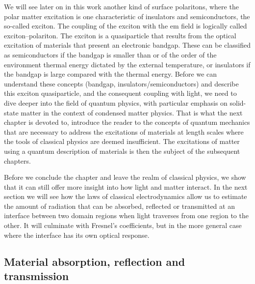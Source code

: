 We will see later on in this work another kind of surface polaritons, where the polar matter excitation is one characteristic of insulators and semiconductors, the so-called exciton.
The coupling of the exciton with the \gls{em} field is logically called exciton--polariton.
The exciton is a quasiparticle that results from the optical excitation of materials that present an electronic bandgap.
These can be classified as semiconductors if the bandgap is smaller than or of the order of the environment thermal energy dictated by the external temperature, or insulators if the bandgap is large compared with the thermal energy.
Before we can understand these concepts (bandgap, insulators/semiconductors) and describe this exciton quasiparticle, and the consequent coupling with light, we need to dive deeper into the field of quantum physics, with particular emphasis on solid-state matter in the context of condensed matter physics.
That is what the next chapter is devoted to, introduce the reader to the concepts of quantum mechanics that are necessary to address the excitations of materials at length scales where the tools of classical physics are deemed insufficient.
The excitations of matter using a quantum description of materials is then the subject of the subsequent chapters.

Before we conclude the chapter and leave the realm of classical physics, we show that it can still offer more insight into how light and matter interact.
In the next section we will see how the laws of classical electrodynamics allow us to estimate the amount of radiation that can be absorbed, reflected or transmitted at an interface between two domain regions when light traverses from one region to the other.
It will culminate with Fresnel's coefficients, but in the more general case where the interface has its own optical response.

\subsection{Material absorption, reflection and transmission}
\label{subsec:polaritonics_absorption}

